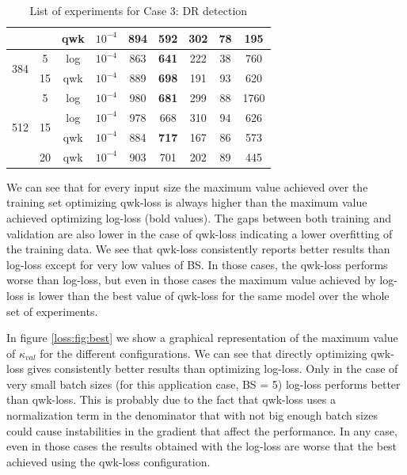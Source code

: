 \begin{table}[h!]
{{\begin{tabular}{c|c|c|c|c|c|c|c|c}
			& & \multirow{1}{*}{qwk} & $10^{-4}$ & 894 & 592 & 302 & 78 & 195\\\cline{2-9}
			\hline					
			\multirow{2}{*}{384} & \multirow{1}{*}{5} & \multirow{1}{*}{log} & $10^{-4}$ & 863 & \textbf{641} & 222 & 38 & 760\\\cline{2-9}
			& \multirow{1}{*}{15} & \multirow{1}{*}{qwk} & $10^{-4}$ & 889 & \textbf{698} & 191 & 93 & 620 \\\cline{2-9}
			\hline					
			\multirow{4}{*}{512} & \multirow{1}{*}{5} & \multirow{1}{*}{log} & $10^{-4}$ & 980 & \textbf{681} & 299 & 88 & 1760\\\cline{2-9}
			& \multirow{2}{*}{15} & \multirow{1}{*}{log} & $10^{-4}$ & 978 & 668 & 310 &  94 & 626\\\cline{3-9}
			&  & \multirow{1}{*}{qwk} & $10^{-4}$ & 884 & \textbf{717} & 167 & 86 & 573 \\\cline{2-9}
			& \multirow{1}{*}{20} & \multirow{1}{*}{qwk} & $10^{-4}$ & 903 & 701 & 202 & 89 & 445\\\cline{3-9}			
			\hline
		\end{tabular}
	}
	}
	\caption[DR detection experiments]{List of experiments for Case 3: DR detection}
	\label{loss:tab:qwk_cv}
\end{table}

We can see that for every input size the maximum value achieved over the training set optimizing qwk-loss is always higher than the maximum value achieved optimizing log-loss (bold values). The gaps between both training and validation are also lower in the case of qwk-loss indicating a lower overfitting of the training data. We see that qwk-loss consistently reports better results than log-loss except for very low values of BS. In those cases, the qwk-loss performs worse than log-loss, but even in those cases the maximum value achieved by log-loss is lower than the best value of qwk-loss for the same model over the whole set of experiments.

In figure \ref{loss:fig:best} we show a graphical representation of the maximum value of $\kappa_{val}$ for the different configurations. We can see that directly optimizing qwk-loss gives consistently better results than optimizing log-loss. Only in the case of very small batch sizes (for this application case, BS = 5) log-loss performs better than qwk-loss. This is probably due to the fact that qwk-loss uses a normalization term in the denominator that with not big enough batch sizes could cause instabilities in the gradient that affect the performance. In any case, even in those cases the results obtained with the log-loss are worse that the best achieved using the qwk-loss configuration.

